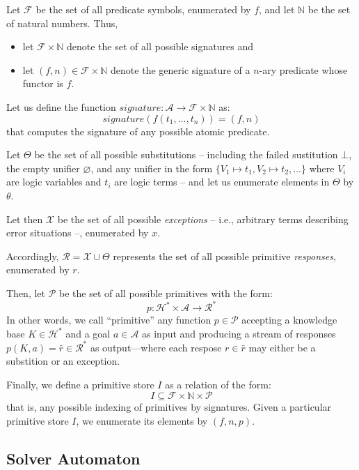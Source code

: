 \documentclass{article}
\newcommand{\stream}[1]{\bar{#1}}
\newcommand{\notableset}[1]{\mathcal{#1}}
\newcommand{\f}[1]{\mathit{#1}}
\newcommand{\fx}[2]{\f{#1}(#2)}
\begin{document}
Let $\notableset{F}$ be the set of all predicate symbols, enumerated by $f$, and let $\mathbb{N}$ be the set of natural numbers.
%
Thus, 
\begin{itemize}
	\item let $\notableset{F} \times \mathbb{N}$ denote the set of all possible signatures and 
	\item let $(f,n) \in \notableset{F} \times \mathbb{N}$ denote the generic signature of a $n$-ary predicate whose functor is $f$.
\end{itemize}
%
Let us define the function $ \f{signature} : \notableset{A} \rightarrow \notableset{F} \times \mathbb{N} $ as:
%
\[ \fx{signature}{f(t_1, \ldots, t_n)} = (f,n) \]
%
that computes the signature of any possible atomic predicate.


Let $\Theta$ be the set of all possible substitutions -- including the failed sustitution $\bot$, the empty unifier $\varnothing$, and any unifier in the form $\{V_1 \mapsto t_1, V_2 \mapsto t_2, \ldots\}$ where $V_i$ are logic variables and $t_i$ are logic terms -- and let us enumerate elements in $\Theta$ by $\theta$.

Let then $\notableset{X}$ be the set of all possible \emph{exceptions} -- i.e., arbitrary terms describing error situations --, enumerated by $x$.

Accordingly, $\notableset{R} = \notableset{X} \cup \Theta$ represents the set of all possible primitive \emph{responses}, enumerated by $r$.

Then, let $\notableset{P}$ be the set of all possible primitives with the form:
%
\[ p : \notableset{H}^* \times \notableset{A} \rightarrow \notableset{R}^* \]
%
In other words, we call ``primitive'' any function $p \in \notableset{P}$ accepting a knowledge base $K \in \notableset{H}^*$ and a goal $a \in \notableset{A}$ as input and producing a stream of responses $p(K, a) = \stream{r} \in \notableset{R}^*$ as output---where each respose $r \in \stream{r}$ may either be a substition or an exception.

Finally, we define a primitive store $I$ as a relation of the form:
%
\[ I \subseteq \notableset{F} \times \mathbb{N} \times \notableset{P} \]
%
that is, any possible indexing of primitives by signatures.
%
Given a particular primitive store $I$, we enumerate its elements by $(f, n, p)$.

\subsection{Solver Automaton}
\end{document}
